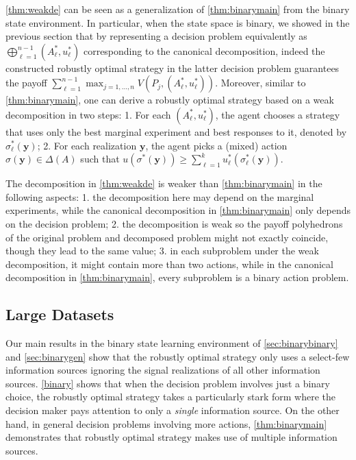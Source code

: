 \documentclass[11pt]{article}
\theoremstyle{plain}
\theoremstyle{remark}
\begin{document}
\autoref{thm:weakde} can be seen as a generalization of \autoref{thm:binarymain} from the binary state environment.  In particular, when the state space is binary, we showed in the previous section that by representing a decision problem equivalently as $\bigoplus_{\ell = 1}^{n - 1} (A_\ell^*, u_\ell^*)$ corresponding to the canonical decomposition, indeed the constructed robustly optimal strategy in the latter decision problem guarantees the payoff $\sum_{\ell = 1}^{n-1} \max_{j = 1, \ldots , n} V(P_j, (A_\ell^*, u_\ell^*))$.  Moreover, similar to \autoref{thm:binarymain}, one can derive a robustly optimal strategy based on a weak decomposition in two steps: 1. For each $(A_\ell^*,u_\ell^*)$, the agent chooses a strategy that uses only the best marginal experiment and best responses to it, denoted by $\sigma^*_\ell(\mathbf{y})$; 2. For each realization $\mathbf{y}$, the agent picks a (mixed) action $\sigma(\mathbf{y})\in\Delta(A)$ such that $u(\sigma^*(\mathbf{y}))\geq \sum_{\ell=1}^k u_{\ell}^*(\sigma_\ell^*(\mathbf{y}))$.



The decomposition in \autoref{thm:weakde} is weaker than \autoref{thm:binarymain} in the following aspects: 1. the decomposition here may depend on the marginal experiments, while the canonical decomposition in \autoref{thm:binarymain} only depends on the decision problem; 2. the decomposition is weak so the payoff polyhedrons of the original problem and decomposed problem might not exactly coincide, though they lead to the same value; 3. in each subproblem under the weak decomposition, it might contain more than two actions, while in the canonical decomposition in \autoref{thm:binarymain}, every subproblem is a binary action problem.


\subsection{Large Datasets}

Our main results in the binary state learning environment of \autoref{sec:binarybinary} and \autoref{sec:binarygen} show that the robustly optimal strategy only uses a select-few information sources ignoring the signal realizations of all other information sources. \autoref{binary} shows that when the decision problem involves just a binary choice, the robustly optimal strategy takes a particularly stark form where the decision maker pays attention to only a \emph{single} information source.  On the other hand, in general decision problems involving more actions, \autoref{thm:binarymain} demonstrates that robustly optimal strategy makes use of multiple information sources.  
\end{document}
